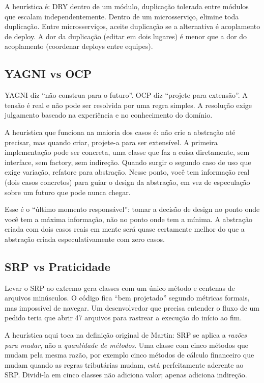 A heurística é: DRY dentro de um módulo, duplicação tolerada entre módulos
que escalam independentemente. Dentro de um microsserviço, elimine toda
duplicação. Entre microsserviços, aceite duplicação se a alternativa é
acoplamento de deploy. A dor da duplicação (editar em dois lugares) é menor
que a dor do acoplamento (coordenar deploys entre equipes).

\subsection{YAGNI vs OCP}

YAGNI diz ``não construa para o futuro''. OCP diz ``projete para extensão''.
A tensão é real e não pode ser resolvida por uma regra simples. A resolução
exige julgamento baseado na experiência e no conhecimento do domínio.

A heurística que funciona na maioria dos casos é: não crie a abstração até
precisar, mas quando criar, projete-a para ser extensível. A primeira
implementação pode ser concreta, uma classe que faz a coisa diretamente,
sem interface, sem factory, sem indireção. Quando surgir o segundo caso de
uso que exige variação, refatore para abstração. Nesse ponto, você tem
informação real (dois casos concretos) para guiar o design da abstração, em
vez de especulação sobre um futuro que pode nunca chegar.

Esse é o ``último momento responsável'': tomar a decisão de design no
ponto onde você tem a máxima informação, não no ponto onde tem a mínima. A
abstração criada com dois casos reais em mente será quase certamente melhor
do que a abstração criada especulativamente com zero casos.

\subsection{SRP vs Praticidade}

Levar o SRP ao extremo gera classes com um único método e centenas de arquivos
minúsculos. O código fica ``bem projetado'' segundo métricas formais, mas
impossível de navegar. Um desenvolvedor que precisa entender o fluxo
de um pedido teria que abrir 47 arquivos para rastrear a execução do início ao
fim.

A heurística aqui toca na definição original de Martin: SRP se aplica a
\emph{razões para mudar}, não a \emph{quantidade de métodos}. Uma classe com
cinco métodos que mudam pela mesma razão, por exemplo cinco métodos de cálculo
financeiro que mudam quando as regras tributárias mudam, está perfeitamente
aderente ao SRP. Dividi-la em cinco classes não adiciona valor; apenas adiciona
indireção.

